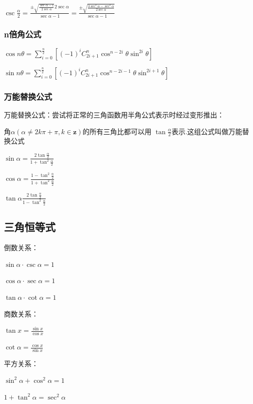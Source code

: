 \documentclass[UTF8]{ctexbook}
\newcommand{\mathCombination}[2]{C_{#1}^{#2}}
\newcommand{\upDownSum}[2]{\sum\limits_{#2}^{#1}}
\begin{document}
{{{{    $\csc\frac{\alpha}{2} = \frac{\pm\sqrt{\frac{\sec\alpha - 1}{2\sec\alpha}}2\sec\alpha}{\sec\alpha - 1} = \frac{\pm\sqrt{\frac{3\sec^3\alpha - \sec^2\alpha}{2\sec\alpha}}}{\sec\alpha - 1}$
  }%

  \subsubsection{n倍角公式}{
    $\cos{n\theta} = \upDownSum{\frac{n}{2}}{i = 0}[(-1)^i\mathCombination{2i + 1}{n}\cos^{n - 2i}\theta\sin^{2i}\theta]$

    $\sin{n\theta} = \upDownSum{\frac{n}{2}}{i = 0}[(-1)^i\mathCombination{2i + 1}{n}\cos^{n - 2i - 1}\theta\sin^{2i+1}\theta]$
  }%

  \subsubsection{万能替换公式}{
    万能替换公式：尝试将正常的三角函数用半角公式表示时经过变形推出：

    角$\alpha(\alpha \neq 2k\pi + \pi ,k \in \mathbf{z})$的所有三角比都可以用 $\tan\frac{\alpha}{2}$表示.这组公式叫做万能替换公式

    $\sin\alpha = \frac{2\tan\frac{\alpha}{2}}{1+\tan^2\frac{\alpha}{2}}$

    $\cos\alpha = \frac{1 - \tan^2\frac{\alpha}{2}}{1 + \tan^2\frac{\alpha}{2}}$

    $\tan\alpha \frac{2\tan\frac{\alpha}{2}}{1 - \tan^2\frac{\alpha}{2}}$
  }%

}%

\subsection{三角恒等式}{

  倒数关系：

  $\sin\alpha \cdot \csc\alpha = 1$

  $\cos\alpha \cdot \sec\alpha = 1$

  $\tan\alpha \cdot \cot\alpha = 1$

  商数关系：

  $\tan{x} = \frac{\sin{x}}{\cos{x}}$

  $\cot\alpha = \frac{\cos x}{\sin x}$

  平方关系：

  $\sin^2\alpha + \cos^2\alpha = 1$

  $1 + \tan^2\alpha = \sec^2\alpha$

}}}
\end{document}
